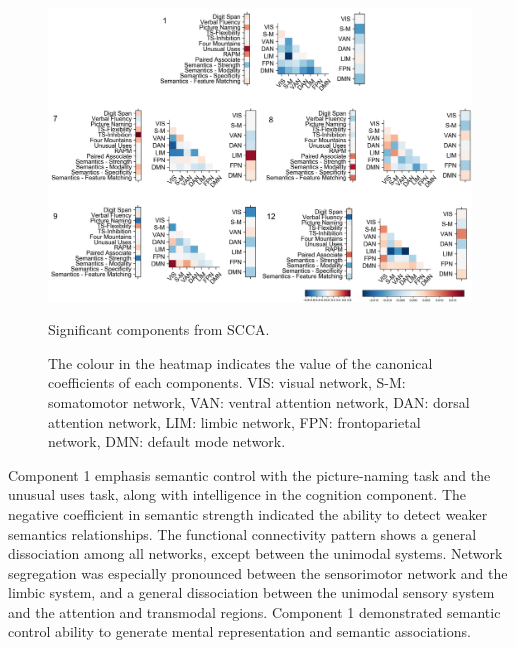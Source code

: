 \begin{figure}[H]
    \centering
    \includegraphics[width=1\textwidth]{study3/image/study3fig3.png}
    \caption{Significant components from SCCA.}
    \caption*{The colour in the heatmap indicates the value of the canonical coefficients of each components. VIS: visual network, S-M: somatomotor network, VAN: ventral attention network, DAN: dorsal attention network, LIM: limbic network, FPN: frontoparietal network, DMN: default mode network.}
    \label{fig:study3:fig3}
\end{figure}

Component 1 emphasis semantic control with the picture-naming task and the unusual uses task, along with intelligence in the cognition component. The negative coefficient in semantic strength indicated the ability to detect weaker semantics relationships. The functional connectivity pattern shows a general dissociation among all networks, except between the unimodal systems. Network segregation was especially pronounced between the sensorimotor network and the limbic system, and a general dissociation between the unimodal sensory system and the attention and transmodal regions. Component 1 demonstrated semantic control ability to generate mental representation and semantic associations. 

